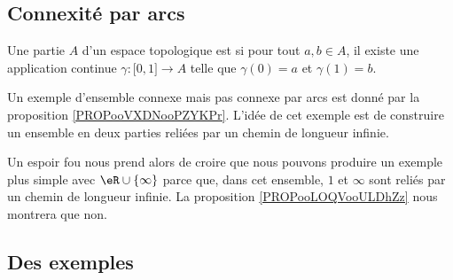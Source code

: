 \subsection{Connexité par arcs}

\begin{definition}      \label{DEFooOXVCooBizpgK}
    Une partie $A$ d'un espace topologique est  si pour tout $ a,b \in A$, il existe une application continue $\gamma\colon \mathopen[ 0 , 1 \mathclose]\to A$ telle que \( \gamma(0)=a\) et \( \gamma(1)=b\).
\end{definition}

\begin{normaltext}
    Un exemple d'ensemble connexe mais pas connexe par arcs est donné par la proposition \ref{PROPooVXDNooPZYKPr}. L'idée de cet exemple est de construire un ensemble en deux parties reliées par un chemin de longueur infinie.

    Un espoir fou nous prend alors de croire que nous pouvons produire un exemple plus simple avec \( \eR\cup\{ \infty \}\) parce que, dans cet ensemble, \( 1\) et \( \infty\) sont reliés par un chemin de longueur infinie. La proposition \ref{PROPooLOQVooULDhZz} nous montrera que non.
\end{normaltext}




\subsection{Des exemples}


